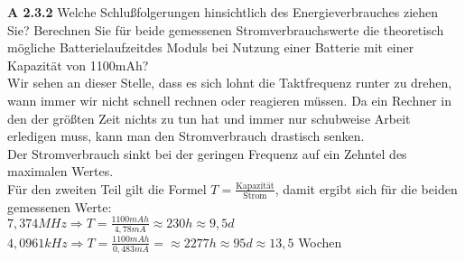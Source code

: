 \begin{description}
\item{\bfseries A 2.3.2} Welche Schlußfolgerungen hinsichtlich des Energieverbrauches ziehen Sie? Berechnen Sie für beide gemessenen Stromverbrauchswerte die theoretisch mögliche Batterielaufzeitdes Moduls bei Nutzung einer Batterie mit einer Kapazität von 1100mAh?\\

Wir sehen an dieser Stelle, dass es sich lohnt die Taktfrequenz runter zu drehen, wann immer wir nicht schnell rechnen oder reagieren müssen. Da ein Rechner in den der größten Zeit nichts zu tun hat und immer nur schubweise Arbeit erledigen muss, kann man den Stromverbrauch drastisch senken.\\

Der Stromverbrauch sinkt bei der geringen Frequenz auf ein Zehntel des maximalen Wertes.\\

Für den zweiten Teil gilt die Formel $T = \frac{\text{Kapazität}}{\text{Strom}}$, damit ergibt sich für die beiden gemessenen Werte:\\

$7,374MHz \Rightarrow T= \frac{1100mAh}{4,78mA} \approx 230h \approx 9,5d$\\

$4,0961kHz \Rightarrow T = \frac{1100mAh}{0,483mA} = \approx 2277h \approx 95d \approx 13,5$ Wochen

\end{description}
